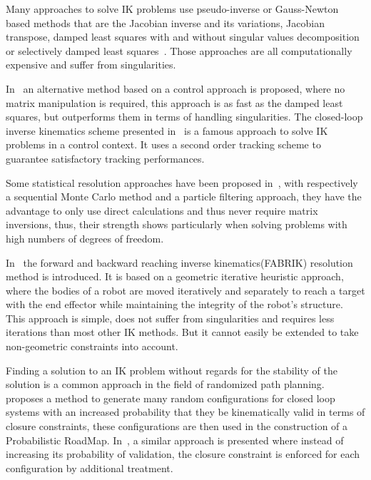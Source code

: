 Many approaches to solve IK problems use pseudo-inverse or Gauss-Newton based methods that are the Jacobian inverse and its variations, Jacobian transpose, damped least squares with and without singular values decomposition or selectively damped least squares~\cite{balestrino1984robust, tolani2000real, baillieul1985kinematic, wampler1986manipulator, nakamura1986inverse, buss2005selectively}.
Those approaches are all computationally expensive and suffer from singularities.

In~\cite{pechev2008inverse} an alternative method based on a control approach is proposed, where no matrix manipulation is required, this approach is as fast as the damped least squares, but outperforms them in terms of handling singularities.
The closed-loop inverse kinematics scheme presented in~\cite{siciliano1990closed} is a famous approach to solve IK problems in a control context.
It uses a second order tracking scheme to guarantee satisfactory tracking performances.

Some statistical resolution approaches have been proposed in~\cite{courty2008inverse, hecker2008real}, with respectively a sequential Monte Carlo method and a particle filtering approach, they have the advantage to only use direct calculations and thus never require matrix inversions, thus, their strength shows particularly when solving problems with high numbers of degrees of freedom.

In~\cite{AristidouFABRIK, Aristidou:2016_ExtFABRIK} the forward and backward reaching inverse kinematics(FABRIK) resolution method is introduced.
It is based on a geometric iterative heuristic approach, where the bodies of a robot are moved iteratively and separately to reach a target with the end effector while maintaining the integrity of the robot's structure.
This approach is simple, does not suffer from singularities and requires less iterations than most other IK methods.
But it cannot easily be extended to take non-geometric constraints into account.

Finding a solution to an IK problem without regards for the stability of the solution is a common approach in the field of randomized path planning.
\cite{cortes2002random} proposes a method to generate many random configurations for closed loop systems with an increased probability that they be kinematically valid in terms of closure constraints, these configurations are then used in the construction of a Probabilistic RoadMap. In~\cite{lavalle1999probabilistic}, a similar approach is presented where instead of increasing its probability of validation, the closure constraint is enforced for each configuration by additional treatment.

